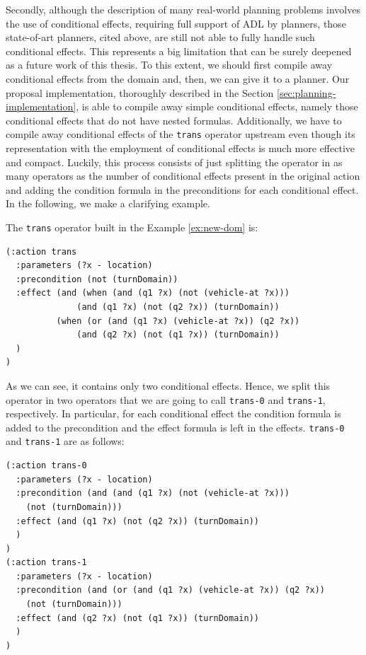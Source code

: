 Secondly, although the description of many real-world planning problems involves the use of conditional effects, requiring full support of ADL by planners, those state-of-art planners, cited above, are still not able to fully handle such conditional effects. This represents a big limitation that can be surely deepened as a future work of this thesis. To this extent, we should first compile away conditional effects from the domain and, then, we can give it to a planner. Our proposal implementation, thoroughly described in the Section \ref{sec:planning-implementation}, is able to compile away simple conditional effects, namely those conditional effects that do not have nested formulas. Additionally, we have to  compile away conditional effects of the \texttt{trans} operator upstream even though its  representation with the employment of conditional effects is much more effective and compact. Luckily, this process consists of just splitting the operator in as many operators as the number of conditional effects present in the original action and adding the condition formula in the preconditions for each conditional effect. In the following, we make a clarifying example.

\begin{example}
The \texttt{trans} operator built in the Example \ref{ex:new-dom} is:
\begin{lstlisting}[language=PDDL, escapechar=£]
(:action trans
  :parameters (?x - location)
  :precondition (not (turnDomain))
  :effect (and (when (and (q1 ?x) (not (vehicle-at ?x)))
              (and (q1 ?x) (not (q2 ?x)) (turnDomain))
          (when (or (and (q1 ?x) (vehicle-at ?x)) (q2 ?x))
              (and (q2 ?x) (not (q1 ?x)) (turnDomain))
  )
)
\end{lstlisting}
As we can see, it contains only two conditional effects. Hence, we split this operator in two operators that we are going to call \texttt{trans-0} and \texttt{trans-1}, respectively. In particular, for each conditional effect the condition formula is added to the precondition and the effect formula is left in the effects. \texttt{trans-0} and \texttt{trans-1} are as follows:
\begin{lstlisting}[language=PDDL, escapechar=£]
(:action trans-0
  :parameters (?x - location)
  :precondition (and (and (q1 ?x) (not (vehicle-at ?x))) 
    (not (turnDomain)))
  :effect (and (q1 ?x) (not (q2 ?x)) (turnDomain))
  )
)
(:action trans-1
  :parameters (?x - location)
  :precondition (and (or (and (q1 ?x) (vehicle-at ?x)) (q2 ?x)) 
    (not (turnDomain)))
  :effect (and (q2 ?x) (not (q1 ?x)) (turnDomain))
  )
)
\end{lstlisting}
\end{example}


